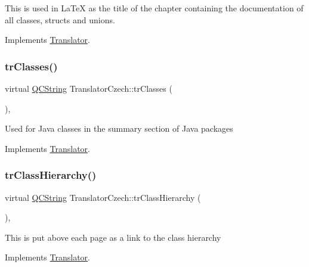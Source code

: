This is used in La\+TeX as the title of the chapter containing the documentation of all classes, structs and unions. 

Implements \mbox{\hyperlink{class_translator}{Translator}}.

\mbox{\label{class_translator_czech_a1248c34985a0016f9bb52e1ff2255e77}} 
\subsubsection{\texorpdfstring{trClasses()}{trClasses()}}
{\footnotesize\ttfamily virtual \mbox{\hyperlink{class_q_c_string}{Q\+C\+String}} Translator\+Czech\+::tr\+Classes (\begin{DoxyParamCaption}{ }\end{DoxyParamCaption})\hspace{0.3cm}{\ttfamily [inline]}, {\ttfamily [virtual]}}

Used for Java classes in the summary section of Java packages 

Implements \mbox{\hyperlink{class_translator}{Translator}}.

\mbox{\label{class_translator_czech_af35e3a4d7ee9363bc7913ff8d370bca0}} 
\subsubsection{\texorpdfstring{trClassHierarchy()}{trClassHierarchy()}}
{\footnotesize\ttfamily virtual \mbox{\hyperlink{class_q_c_string}{Q\+C\+String}} Translator\+Czech\+::tr\+Class\+Hierarchy (\begin{DoxyParamCaption}{ }\end{DoxyParamCaption})\hspace{0.3cm}{\ttfamily [inline]}, {\ttfamily [virtual]}}

This is put above each page as a link to the class hierarchy 

Implements \mbox{\hyperlink{class_translator}{Translator}}.

\mbox{\label{class_translator_czech_a13179bcc9afb184e1eae5c7826290240}} 
